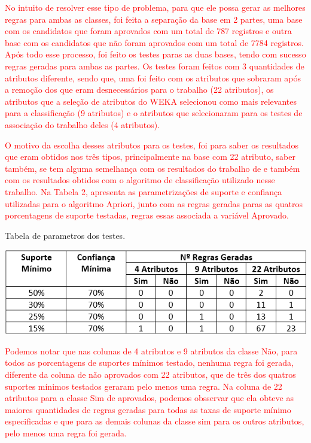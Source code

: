 \par
\textcolor{red}{No intuito de resolver esse tipo de problema, para que ele possa gerar as melhores regras para ambas as classes, foi feita a separação da base em 2 partes, uma base com os candidatos que foram aprovados com um total de 787 registros e outra base com os candidatos que não foram aprovados com um total de 7784 registros. Após todo esse processo, foi feito os testes paras as duas bases, tendo com sucesso regras geradas para ambas as partes. Os testes foram feitos com 3 quantidades de atributos diferente, sendo que, uma foi feito com os atributos que sobraram após a remoção dos que eram desnecessários para o trabalho (22 atributos), os atributos que a seleção de atributos do WEKA selecionou como mais relevantes para a classificação (9 atributos) e o atributos que  selecionaram para os testes de associação do trabalho deles (4 atributos).}

\par
\textcolor{red}{O motivo da escolha desses atributos para os testes, foi para saber os resultados que eram obtidos nos três tipos, principalmente na base com 22 atributo, saber também, se tem alguma semelhança com os resultados do trabalho de  e também com os resultados obtidos com o algoritmo de classificação utilizado nesse trabalho. Na Tabela 2, apresenta as parametrizações de suporte e confiança utilizadas para o algoritmo Apriori, junto com as regras geradas paras as quatros porcentagens de suporte testadas, regras essas associada a variável Aprovado.}


\par
\begin{table}[!htp]
	\begin{center}
    \caption{\label{fig:waveform_fig} Tabela de parametros dos testes.}
	\includegraphics[scale=0.90]{Figuras/Tabela_de_parametros_apriori.png}
	\end{center}
\end{table}

\par
\textcolor{red}{Podemos notar que nas colunas de 4 atributos e 9 atributos da classe Não, para todos as porcentagens de suportes mínimos testado, nenhuma regra foi gerada, diferente da coluna de não aprovados com 22 atributos, que de três dos quatros suportes mínimos testados geraram pelo menos uma regra. Na coluna de 22 atributos para a classe Sim de aprovados, podemos obsservar que ela obteve as maiores quantidades de regras geradas para todas as taxas de suporte mínimo especificadas e que para as demais colunas da classe sim para os outros atributos, pelo menos uma regra foi gerada.}

